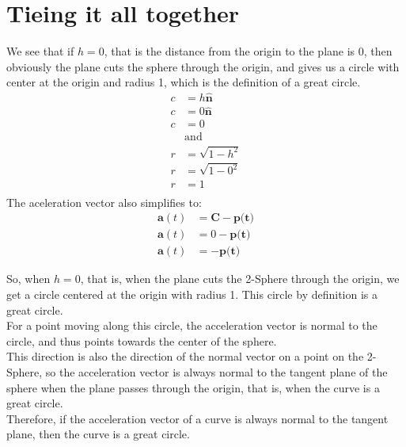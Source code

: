 \documentclass[11pt]{article}
\begin{document}
\section*{Tieing it all together}
We see that if $h = 0$, that is the distance from the origin to the plane is 0, then obviously the plane cuts the sphere through the origin, and gives us a circle with center at the origin and radius 1, which is the definition of a great circle.
\begin{align*}
    c &= h \hat{\textbf{n}} \\
    c &= 0 \hat{\textbf{n}} \\
    c &= 0                  \\[1ex]
    &\text{and}             \\[1ex]
    r &= \sqrt{1- h^2}      \\
    r &= \sqrt{1- 0^2}      \\
    r &= 1                  \\
\end{align*}
The aceleration vector also simplifies to:
\begin{align*}
    \mathbf{a}(t) & = \mathbf{C} - \textbf{p(t)} \\
    \mathbf{a}(t) & = 0 - \textbf{p(t)} \\
    \mathbf{a}(t) & = - \textbf{p(t)}
\end{align*}

So, when $h = 0$, that is, when the plane cuts the 2-Sphere through the origin, we get a circle centered at the origin with radius 1. This circle by definition is a great circle.  \\[1ex]
For a point moving along this circle, the acceleration vector is normal to the circle, and thus points towards the center of the sphere. \\[1ex]
This direction is also the direction of the normal vector on a point on the 2-Sphere, so the acceleration vector is always normal to the tangent plane of the sphere when the plane passes through the origin, that is, when the curve is a great circle. \\[1ex]
Therefore, if the acceleration vector of a curve is always normal to the tangent plane, then the curve is a great circle.
\end{document}
